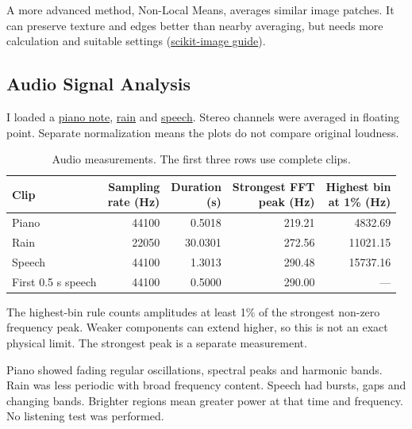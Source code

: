 \documentclass[11pt,a4paper]{article}
\begin{document}
A more advanced method, Non-Local Means, averages similar image patches.
It can preserve texture and edges better than nearby averaging, but needs more
calculation and suitable settings
(\href{https://scikit-image.org/docs/stable/auto_examples/filters/plot_nonlocal_means.html}{scikit-image guide}).

\subsection{Audio Signal Analysis}
I loaded a
\href{https://raw.githubusercontent.com/parisjava/wav-piano-sound/master/wav/a1.wav}{piano note},
\href{https://www.pacdv.com/sounds/ambience_sounds/rain_2.wav}{rain} and
\href{https://www.pacdv.com/sounds/voices/can-you-keep-a-secret.wav}{speech}.
Stereo channels were averaged in floating point. Separate normalization means
the plots do not compare original loudness.

\begin{table}[!htbp]
\centering
\caption{Audio measurements. The first three rows use complete clips.}
\label{tab:audio}
\small
\begin{tabular}{lrrrr}
\toprule
Clip & \shortstack{Sampling\\rate (Hz)} & \shortstack{Duration\\(s)} &
\shortstack{Strongest FFT\\peak (Hz)} & \shortstack{Highest bin\\at 1\% (Hz)}\\
\midrule
Piano & 44100 & 0.5018 & 219.21 & 4832.69\\
Rain & 22050 & 30.0301 & 272.56 & 11021.15\\
Speech & 44100 & 1.3013 & 290.48 & 15737.16\\
First 0.5 s speech & 44100 & 0.5000 & 290.00 & ---\\
\bottomrule
\end{tabular}
\end{table}

The highest-bin rule counts amplitudes at least 1\% of the strongest non-zero
frequency peak. Weaker components can extend higher, so this is not an exact
physical limit. The strongest peak is a separate measurement.

Piano showed fading regular oscillations, spectral peaks and harmonic bands.
Rain was less periodic with broad frequency content. Speech had bursts, gaps
and changing bands. Brighter regions mean greater power at that time and
frequency. No listening test was performed.
\end{document}
